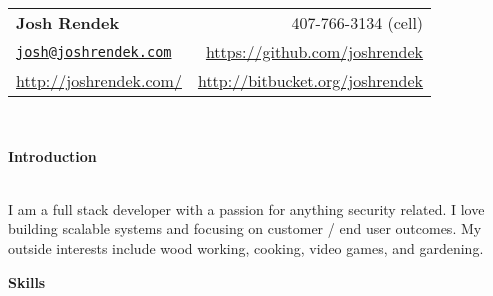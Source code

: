 \documentclass[a4paper,11pt,sans]{article}
\newcommand{\resheading}[1]{{\large \colorbox{myblue}{\begin{minipage}{\textwidth}{\textbf{#1 \vphantom{p\^{E}}}}\end{minipage}}}}
\begin{document}
\newcommand{\infoheader}{
\begin{tabular*}{7.5in}{l@{\extracolsep{\fill}}r}
\textbf{\LARGE Josh Rendek }  & 407-766-3134 (cell) \\
\href{mailto:josh@joshrendek.com}{\nolinkurl{josh@joshrendek.com}} & \url{https://github.com/joshrendek} \\
\url{http://joshrendek.com/} & \url{http://bitbucket.org/joshrendek} \\
\end{tabular*}
\\

\vspace{0.1in}
}

\newcommand{\pagebreakwithheader}{\pagebreak\infoheader}

\infoheader

\resheading{\color{white} Introduction}
\hspace{3pt} \\
I am a full stack developer with a passion for anything security related. I love building scalable systems and focusing on customer / end user outcomes. My outside interests include wood working, cooking, video games, and gardening.

\linebreak

\linebreak

\resheading{\color{white} Skills}
\end{document}
